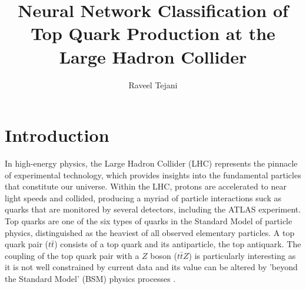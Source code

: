 \documentclass[]{article}
\title{Neural Network Classification of Top Quark Production at the Large Hadron Collider }
\author{Raveel Tejani}
\date{\parbox{\linewidth}{\centering%
		\today\endgraf\bigskip\bigskip\bigskip\bigskip\bigskip\bigskip\bigskip\bigskip\bigskip\bigskip
		\bigskip\bigskip\bigskip\bigskip\bigskip\bigskip\bigskip\bigskip\bigskip
		PHYS 310 \endgraf\bigskip
		University of British Columbia}}
\begin{document}
\maketitle
\thispagestyle{empty}
\clearpage

\tableofcontents 
\thispagestyle{empty}
\clearpage

\listoftables
\thispagestyle{empty}
\clearpage
             
\listoffigures
\thispagestyle{empty}
\clearpage     

\section{Introduction}

In high-energy physics, the Large Hadron Collider (LHC) represents the pinnacle of experimental technology, which provides insights into the fundamental particles that constitute our universe. Within the LHC, protons are accelerated to near light speeds and collided, producing a myriad of particle interactions suck as quarks that are monitored by several detectors, including the ATLAS experiment.  Top quarks are one of the six types of quarks in the Standard Model of particle physics, distinguished as the heaviest of all observed elementary particles. A top quark pair ($t\bar{t}$) consists of a top quark and its antiparticle, the top antiquark. The coupling of the top quark pair with a $Z$ boson ($t\bar{t}Z$) is particularly interesting as it is not well constrained by current data and its value can be altered by 'beyond the Standard Model' (BSM) physics processes \cite{ttZ}.
\end{document}
